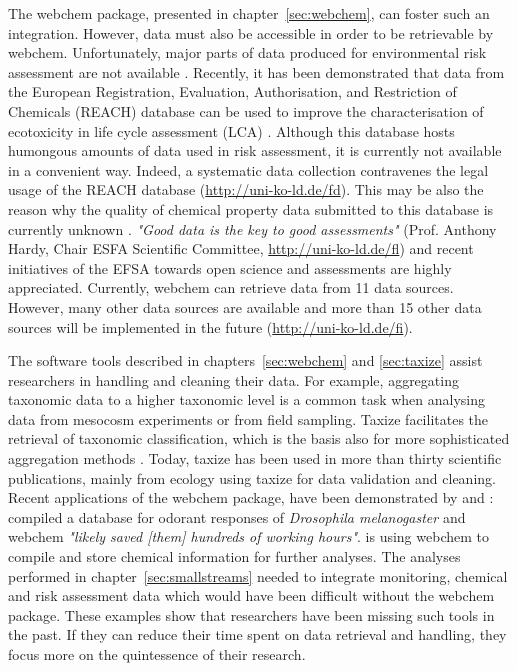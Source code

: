 The webchem package, presented in chapter~\ref{sec:webchem}, can foster such an integration.
However, data must also be accessible in order to be retrievable by webchem. 
Unfortunately, major parts of data produced for environmental risk assessment are not available \citep{schafer_letter_2013, dafforn_big_2015}. 
Recently, it has been demonstrated that data from the European Registration, Evaluation, Authorisation, and Restriction of Chemicals (REACH) database can be used to improve the characterisation of ecotoxicity in life cycle assessment (LCA) \citep{muller_exploring_2016}.
Although this database hosts humongous amounts of data used in risk assessment, it is currently not available in a convenient way.
Indeed, a systematic data collection contravenes the legal usage of the REACH database (\url{http://uni-ko-ld.de/fd}).
This may be also the reason why the quality of chemical property data submitted to this database is currently unknown \citep{stieger_assessing_2014, muller_exploring_2016}. 
\emph{"Good data is the key to good assessments"} (Prof. Anthony Hardy, Chair ESFA Scientific Committee, \url{http://uni-ko-ld.de/fl}) and recent initiatives of the EFSA towards open science and assessments are highly appreciated. 
Currently, webchem can retrieve data from 11 data sources. 
However, many other data sources are available and more than 15 other data sources will be implemented in the future (\url{http://uni-ko-ld.de/fi}).

The software tools described in chapters~\ref{sec:webchem} and \ref{sec:taxize} assist researchers in handling and cleaning their data. 
For example, aggregating taxonomic data to a higher taxonomic level is a common task when analysing data from mesocosm experiments or from field sampling.
Taxize facilitates the retrieval of taxonomic classification, which is the basis also for more sophisticated aggregation methods \citep{cuffney_ambiguous_2007}. 
Today, taxize has been used in more than thirty scientific publications, mainly from ecology using taxize for data validation and cleaning.
Recent applications of the webchem package, have been demonstrated by \citet{munch_door_2016} and \citet{ranke_chents_2016}: 
\citet{munch_door_2016} compiled a database for odorant responses of \textit{Drosophila melanogaster} and webchem \emph{"likely saved [them] hundreds of working hours"}. 
\citet{ranke_chents_2016} is using webchem to compile and store chemical information for further analyses. 
The analyses performed in chapter~\ref{sec:smallstreams} needed to integrate monitoring, chemical and risk assessment data which would have been difficult without the webchem package. 
These examples show that researchers have been missing such tools in the past.
If they can reduce their time spent on data retrieval and handling, they focus more on the quintessence of their research. 



